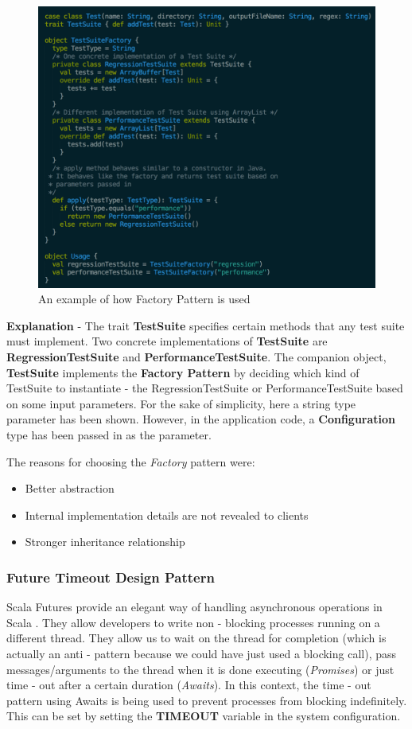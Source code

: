 \begin{figure}[H]
  \centering
    \includegraphics[width=500px]{figures/factory.png}
    \caption{An example of how Factory Pattern is used}
\end{figure}

\noindent
\textbf{Explanation} - The trait \textbf{TestSuite} specifies certain methods that any test suite must implement. Two concrete implementations of \textbf{TestSuite} are \textbf{RegressionTestSuite} and \textbf{PerformanceTestSuite}. The companion object, \textbf{TestSuite} implements the \textbf{Factory Pattern} by deciding which kind of TestSuite to instantiate - the RegressionTestSuite or PerformanceTestSuite based on some input parameters. For the sake of simplicity, here a string type parameter has been shown. However, in the application code, a \textbf{Configuration} type has been passed in as the parameter.

\noindent
The reasons for choosing the \textit{Factory} pattern were:
\begin{itemize}
\item Better abstraction
\item Internal implementation details are not revealed to clients
\item Stronger inheritance relationship
\end{itemize}

\subsubsection{Future Timeout Design Pattern}
Scala Futures provide an elegant way of handling asynchronous operations in Scala \cite{scala}. They allow developers to write non - blocking processes running on a different thread. They allow us to wait on the thread for completion (which is actually an anti - pattern because we could have just used a blocking call), pass messages/arguments to the thread when it is done executing (\textit{Promises}) or just time - out after a certain duration (\textit{Awaits}). In this context, the time - out pattern using Awaits is being used to prevent processes from blocking indefinitely. This can be set by setting the \textbf{TIMEOUT} variable in the system configuration.

